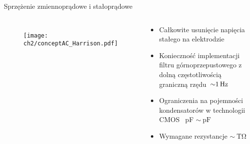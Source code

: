 


\begin{frame}{Sprzężenie zmiennoprądowe i stałoprądowe}
    

    \begin{columns}
        \vspace{-1em} %

        \begin{figure}[H]
            \centering
            \texttt{[image: ch2/conceptAC\_Harrison.pdf]} 
        \end{figure}
        \vspace{-2em} %

        {\renewcommand\normalsize{\small}%
        \normalsize
    
    
        \begin{exampleblock}{}

            \begin{itemize}
                \item Całkowite usunięcie napięcia stałego na elektrodzie 
                \item Konieczność implementacji filtru górnoprzepustowego z dolną częstotliwością graniczną rzędu~$\SI{\sim 1}{\hertz}$ 
                \item Ograniczenia na pojemności kondensatorów w technologii CMOS ~pF $\sim\SI{}{\pico\farad}$
                \item  Wymagane rezystancje  $\sim\SI{}{\tera\ohm}$
            \end{itemize}
        \end{exampleblock}
    
        }



\end{columns}
\end{frame}
